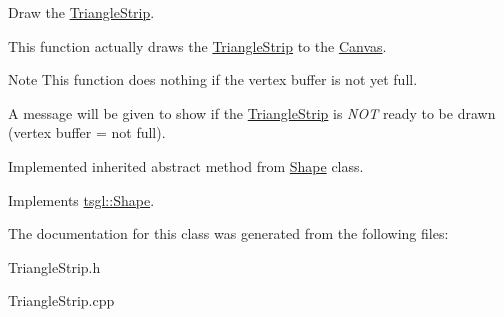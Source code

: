 Draw the \hyperlink{classtsgl_1_1_triangle_strip}{Triangle\+Strip}. 

This function actually draws the \hyperlink{classtsgl_1_1_triangle_strip}{Triangle\+Strip} to the \hyperlink{classtsgl_1_1_canvas}{Canvas}. \begin{DoxyNote}{Note}
This function does nothing if the vertex buffer is not yet full. 

A message will be given to show if the \hyperlink{classtsgl_1_1_triangle_strip}{Triangle\+Strip} is {\itshape N\+O\+T} ready to be drawn (vertex buffer = not full). 

Implemented inherited abstract method from \hyperlink{classtsgl_1_1_shape}{Shape} class. 
\end{DoxyNote}


Implements \hyperlink{classtsgl_1_1_shape_af78b1627b97d621824ce86db214e2402}{tsgl\+::\+Shape}.



The documentation for this class was generated from the following files\+:\begin{DoxyCompactItemize}
\item 
Triangle\+Strip.\+h\item 
Triangle\+Strip.\+cpp\end{DoxyCompactItemize}
